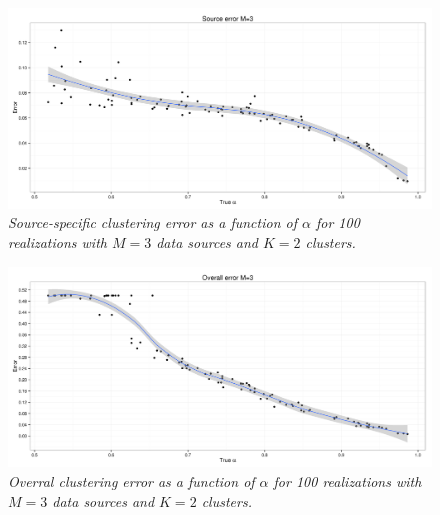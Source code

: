 \begin{figure}[!ht]
\begin{center}
 \includegraphics[scale = 0.41]{images/sourceError.png}
\caption{\emph{Source-specific clustering error as a function of $\alpha$ for 100 realizations with $M=3$ data sources and $K=2$ clusters.}}
\label{source-error-pic}
\end{center}
\end{figure}
\begin{figure}[!ht]
\begin{center}
 \includegraphics[scale = 0.41]{images/overallError.png}
\caption{\emph{Overral clustering error as a function of $\alpha$ for 100 realizations with $M=3$ data sources and $K=2$ clusters.}}
\label{overall-error-pic}
\end{center}
\end{figure}